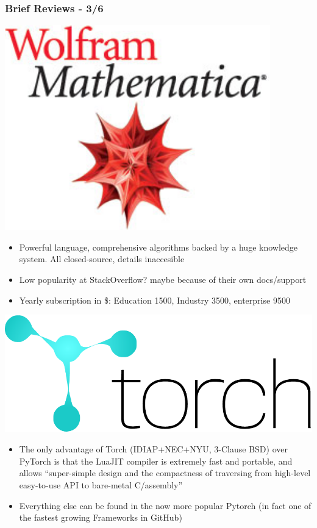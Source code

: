 \documentclass[hyperref={pdfpagelabels=false}]{beamer}
\begin{document}
     \begin{frame}
       \frametitle{Brief Reviews - 3/6}
       
       \centering
       \includegraphics[scale=0.13]{logo_mathematica.png}
       \begin{itemize}[<.->]
       \item \small{Powerful language, comprehensive algorithms backed by a huge knowledge system. All closed-source, details inaccesible}
       \item \small{Low popularity at StackOverflow? maybe because of their own docs/support}
       \item \small{Yearly subscription in \$: Education 1500, Industry 3500, enterprise 9500\cite{mathematica-web} }
       \end{itemize}
       \vspace{2mm}
       \centering
       \includegraphics[scale=0.07]{logo_torch.png}
       \begin{itemize}[<.->]
       \item \small{The only advantage of Torch (IDIAP+NEC+NYU, 3-Clause BSD) over PyTorch is that the LuaJIT compiler is extremely fast and portable, and allows ``super-simple design and the compactness of traversing from high-level easy-to-use API to bare-metal C/assembly''\cite{smhx}}
       \item \small{Everything else can be found in the now more popular Pytorch (in fact one of the fastest growing Frameworks in GitHub)}
       \end{itemize}
     \end{frame}
\end{document}
